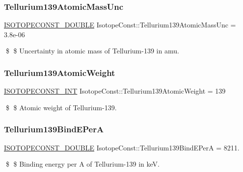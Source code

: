 \subsubsection{\texorpdfstring{Tellurium139\+Atomic\+Mass\+Unc}{Tellurium139AtomicMassUnc}}
{\footnotesize\ttfamily \mbox{\hyperlink{group___isotope_const-_macros_ga8f45a7272ce02c0b4c65c44636ed719a}{I\+S\+O\+T\+O\+P\+E\+C\+O\+N\+S\+T\+\_\+\+D\+O\+U\+B\+LE}} Isotope\+Const\+::\+Tellurium139\+Atomic\+Mass\+Unc = 3.\+8e-\/06}

\$ \$ Uncertainty in atomic mass of Tellurium-\/139 in amu. \mbox{\label{group___isotope_const-_tellurium-_te139_ga357bad17ccd972564165f323b9dec8a6}} 
\subsubsection{\texorpdfstring{Tellurium139\+Atomic\+Weight}{Tellurium139AtomicWeight}}
{\footnotesize\ttfamily \mbox{\hyperlink{group___isotope_const-_macros_ga5f18360b3e99483a35c32d789e62621c}{I\+S\+O\+T\+O\+P\+E\+C\+O\+N\+S\+T\+\_\+\+I\+NT}} Isotope\+Const\+::\+Tellurium139\+Atomic\+Weight = 139}

\$ \$ Atomic weight of Tellurium-\/139. \mbox{\label{group___isotope_const-_tellurium-_te139_ga7dc185d90bf03c04adb492ff4744d716}} 
\subsubsection{\texorpdfstring{Tellurium139\+Bind\+E\+PerA}{Tellurium139BindEPerA}}
{\footnotesize\ttfamily \mbox{\hyperlink{group___isotope_const-_macros_ga8f45a7272ce02c0b4c65c44636ed719a}{I\+S\+O\+T\+O\+P\+E\+C\+O\+N\+S\+T\+\_\+\+D\+O\+U\+B\+LE}} Isotope\+Const\+::\+Tellurium139\+Bind\+E\+PerA = 8211.}

\$ \$ Binding energy per A of Tellurium-\/139 in keV. \mbox{\label{group___isotope_const-_tellurium-_te139_ga034776920de1d1e6b331deed103ae6a5}} 
